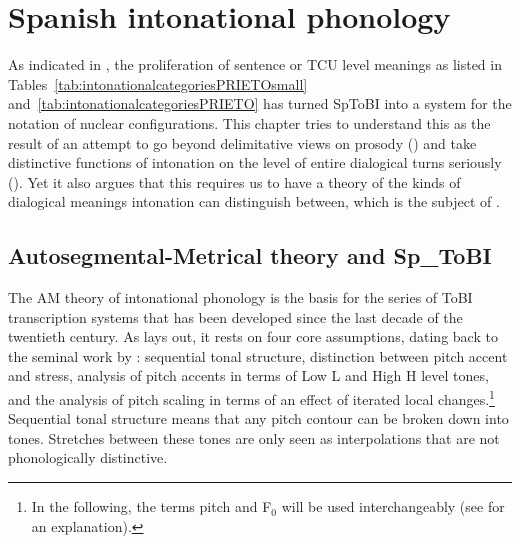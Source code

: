 
\chapter{Spanish intonational phonology} %

\label{ch:2}

As indicated in , the proliferation of sentence or \ac{TCU} level meanings as listed in Tables~\ref{tab:intonationalcategoriesPRIETOsmall} and~\ref{tab:intonationalcategoriesPRIETO} has turned \ac{SpToBI} into a system for the notation of nuclear configurations. This chapter tries to understand this as the result of an attempt to go beyond delimitative views on prosody () and take distinctive functions of intonation on the level of entire dialogical turns seriously (). Yet it also argues that this requires us to have a theory of the kinds of dialogical meanings intonation can distinguish between, which is the subject of .


\section{Autosegmental-Metrical theory and Sp\_ToBI}
\label{ch:2.1}

The \ac{AM} theory of intonational phonology is the basis for the series of \ac{ToBI} transcription systems that has been developed since the last decade of the twentieth century. As \citet[42]{Ladd2008} lays out, it rests on four core assumptions, dating back to the seminal work by \citet{Pierrehumbert1980}: sequential tonal structure, distinction between pitch accent and stress, analysis of pitch accents in terms of Low L and High H level tones, and the analysis of pitch scaling in terms of an effect of iterated local changes.\footnote{In the following, the terms pitch and F$_0$ will be used interchangeably (see \cite[5]{Ladd2008} for an explanation).} Sequential tonal structure means that any pitch contour can be broken down into tones. Stretches between these tones are only seen as interpolations that are not phonologically distinctive.

